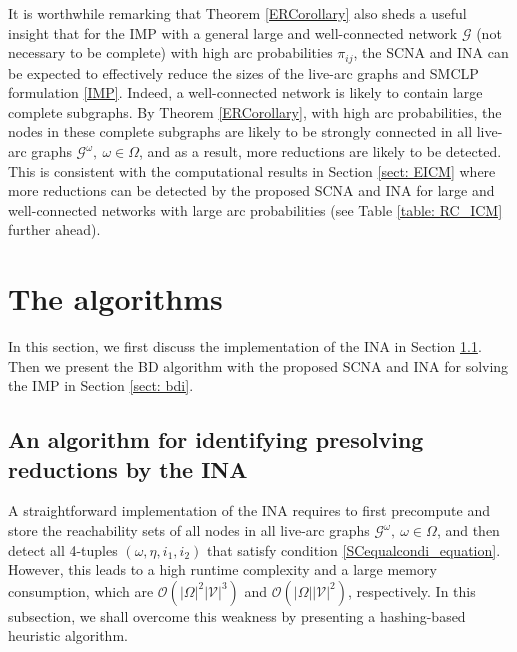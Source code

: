 \documentclass[a4paper,10pt]{article}
\newcommand{\G}{\mathcal{G}}
\newcommand{\V}{\mathcal{V}}
\theoremstyle{plain}
\newcommand{\rev}[1]{{\color{black}#1}}
\newcommand{\revv}[1]{{#1}}
\begin{document}
{		\rev{It is worthwhile remarking that Theorem \ref{ERCorollary} also sheds a useful insight that for the IMP  with a general large and \revv{well-connected} network $\G$ 
			(not necessary to be complete) with high arc probabilities $\pi_{ij}$, 
			the SCNA and INA can be expected to effectively reduce the sizes of the live-arc graphs and SMCLP formulation \eqref{IMP}.
			Indeed, a \revv{well-connected} network is likely to contain \revv{large} complete subgraphs. 
			By Theorem \ref{ERCorollary}, with high arc probabilities, the nodes in these complete subgraphs are likely to be strongly connected in all live-arc graphs $\G^{\omega},~\omega\in\Omega$, 
			and as a result, more reductions are likely to be detected.
			This is consistent with the computational results in \revv{Section} \ref{sect: EICM} where more reductions can be detected by the proposed SCNA and INA 
			for large and \revv{well-connected} networks with large arc probabilities 
			(see Table \ref{table: RC_ICM} further ahead).}
	
	\section{The algorithms}\label{sect: al}
	In this section, we first discuss the implementation of the INA in \revv{Section} \ref{subsect: im_pre}.
	Then we present the BD algorithm with the proposed SCNA and INA for solving the IMP in \revv{Section} \ref{sect: bdi}.
	
	\subsection{An algorithm for identifying presolving reductions by the INA}\label{subsect: im_pre}
	
	A straightforward implementation of the INA requires to first precompute and store the reachability sets of all nodes in all live-arc graphs $\mathcal{G}^\omega,~\omega\in\Omega$, and then detect all 4-tuples $(\omega,\eta,i_1,i_2 )$ that satisfy condition \eqref{SCequalcondi_equation}.
	However, this leads to a high runtime complexity and a large memory consumption, which are  $\mathcal{O}({|\Omega|}^2{|\V|}^3)$ and $\mathcal{O}(|\Omega||\V|^2)$, respectively.
	In this subsection, we shall overcome this weakness by presenting a hashing-based heuristic algorithm.
	
}
\end{document}
